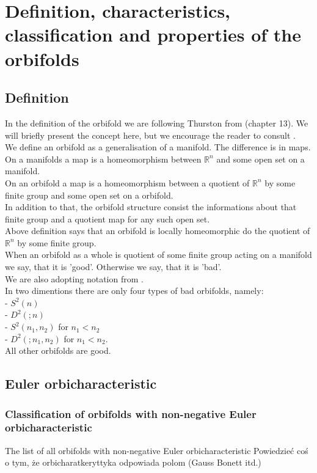 \chapter{Definition, characteristics, classification and properties of the orbifolds}
\section{Definition}
In the definition of the orbifold we are following Thurston from \cite{Thurston1979} (chapter 13). 
We will briefly present the concept here, but we encourage the reader to consult 
\cite{Thurston1979}. \\
We define an orbifold as a generalisation of a manifold. The difference is in maps. \\
On a manifolds a map is a homeomorphism between $\mathbb{R}^n$ and some open set on a manifold. \\
On an orbifold a map is a homeomorphism between a quotient of $\mathbb{R}^n$ by some 
finite group and some open set on a orbifold. \\
In addition to that, the orbifold structure consist the informations about that finite group 
and a quotient map for any such open set. \\

Above definition says that an orbifold is locally homeomorphic do the quotient of $\mathbb{R}^n$ 
by some finite group. \\
When an orbifold as a whole is quotient of some finite group acting on a manifold we say, that 
it is 'good'. Otherwise we say, that it is 'bad'. \\

We are also adopting notation from \cite{Thurston1979}. \\

In two dimentions there are only four types of bad orbifolds, namely: \\
- $S^2(n)$ \\
- $D^2(;n)$ \\
- $S^2(n_1,n_2)$ for $n_1 < n_2$ \\
- $D^2(;n_1,n_2)$ for $n_1 < n_2$. \\
All other orbifolds are good.
\section{Euler orbicharacteristic}
\subsection{Classification of orbifolds with non-negative Euler orbicharacteristic}
The list of all orbifolds with non-negative Euler orbicharacteristic
Powiedzieć coś o tym, że orbicharatkeryttyka odpowiada polom (Gauss Bonett itd.)
